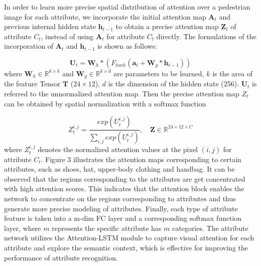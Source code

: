 \documentclass[sigconf]{acmart}
\begin{document}
In order to learn more precise spatial distribution of attention over a pedestrian image for each attribute, we incorporate the initial attention map $\boldsymbol{A}_t$ and previous internal hidden state $\boldsymbol{h}_{t-1}$ to obtain a precise attention map $\boldsymbol{Z}_t$ of attribute $C_t$, instead of using $\boldsymbol{A}_t$ for attribute $C_t$ directly. The formulations of the incorporation of $\boldsymbol{A}_t$ and $\boldsymbol{h}_{t-1}$ is shown as follows:

\begin{equation}
\boldsymbol{U}_t = \boldsymbol{W}_h*(F_{tanh}(\boldsymbol{a}_t + \boldsymbol{W}_g*\boldsymbol{h}_{t-1}))
\end{equation}
where $\boldsymbol{W}_h \in \mathbb{R}^{k\times k}$ and $\boldsymbol{W}_g \in \mathbb{R}^{k\times d}$ are parameters to be learned, $k$ is the area of the feature Tensor $\boldsymbol{T}$ ($24\times12$), $d$ is the dimension of the hidden state (256). $\boldsymbol{U}_t$ is referred to the unnormalized attention map. Then the precise attention map $Z_t$ can be obtained by spatial normalization with a softmax function

\begin{equation}
Z^{i,j}_t = \frac{exp(U^{i,j}_t)}{\sum_{i,j}exp(U^{i,j}_t)}, \quad \mathbf{Z}\in\mathbb{R}^{24\times12\times C}
\end{equation}
where $Z^{i,j}_t$ denotes the normalized attention values at the pixel $(i,j)$ for attribute $C_t$. Figure 3 illustrates the attention maps corresponding to certain attributes, such as shoes, hat, upper-body clothing and handbag. It can be observed that the regions corresponding to the attributes are get concentrated with high attention scores. This indicates that the attention block enables the network to concentrate on the regions corresponding to attributes and thus generate more precise modeling of attributes. Finally, each type of attribute feature is taken into a m-dim FC layer and a corresponding softmax function layer, where $m$ represents the specific attribute has $m$ categories. The attribute network utilizes the Attention-LSTM module to capture visual attention for each attribute and explore the semantic context, which is effective for improving the performance of attribute recognition.
\end{document}
